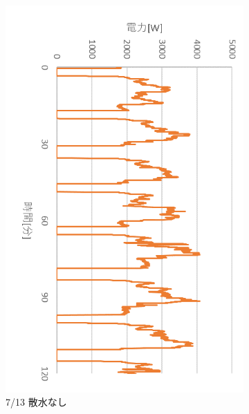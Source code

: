 \documentclass[a4j,fleqn,dvipdfmx,uplatex]{jsarticle}
\begin{document}
\begin{figure}[htb]
  \centering
  \begin{subfigure}[t]{0.32\linewidth}
    \centering
    \includegraphics[width=\linewidth]{img/0713_power.png}
    \caption{7/13 散水なし}\label{fig:a}
  \end{subfigure}
  \begin{subfigure}[t]{0.32\linewidth}
    \centering

\end{subfigure}
\end{figure}
\end{document}
